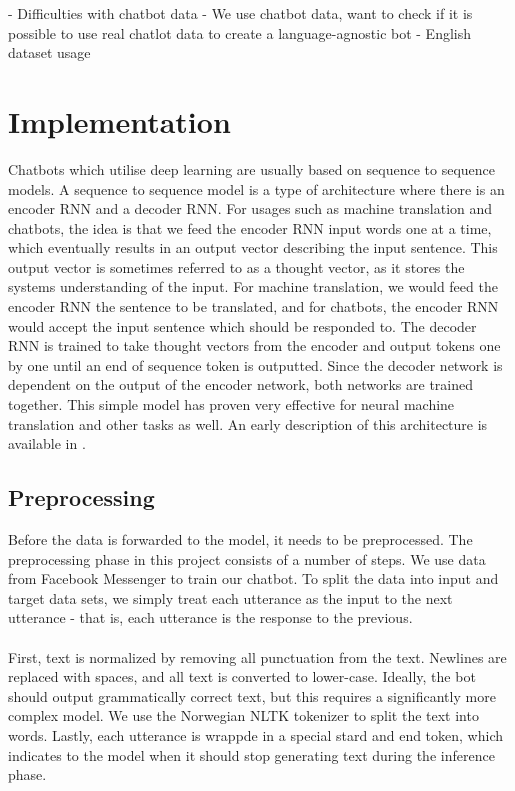 \documentclass{article}
\begin{document}
\if
- Difficulties with chatbot data 
- We use chatbot data, want to check if it is possible to use real chatlot data
to create a language-agnostic bot 
- English dataset usage
\fi

\section{Implementation}

Chatbots which utilise deep learning are usually based on sequence to sequence
models. A sequence to sequence model is a type of architecture where there is
an encoder RNN and a decoder RNN. For usages such as machine translation and
chatbots, the idea is that we feed the encoder RNN input words one at a time,
which eventually results in an output vector describing the input sentence.
This output vector is sometimes referred to as a thought vector, as it stores
the systems understanding of the input. For machine translation, we would feed
the encoder RNN the sentence to be translated, and for chatbots, the encoder
RNN would accept the input sentence which should be responded to. The decoder
RNN is trained to take thought vectors from the encoder and output tokens
one by one until an end of sequence token is outputted. Since the decoder
network is dependent on the output of the encoder network, both networks are
trained together. This simple model has proven very effective for neural
machine translation and other tasks as well. An early description of this
architecture is available in \cite{Cho2014}.

\subsection{Preprocessing}

Before the data is forwarded to the model, it needs to be preprocessed. The
preprocessing phase in this project consists of a number of steps. We use
data from Facebook Messenger to train our chatbot. To split the data into
input and target data sets, we simply treat each utterance as the input to
the next utterance - that is, each utterance is the response to the previous.

\paragraph{}
First, text is normalized by removing all punctuation from the text. Newlines
are replaced with spaces, and all text is converted to lower-case. Ideally,
the bot should output grammatically correct text, but this requires a
significantly more complex model. We use the Norwegian NLTK tokenizer to split
the text into words. Lastly, each utterance is wrappde in a special stard and
end token, which indicates to the model when it should stop generating text
during the inference phase.
\end{document}

